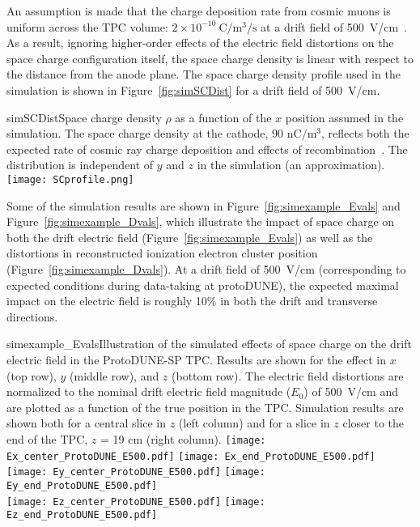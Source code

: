 An assumption is made that the charge deposition rate from cosmic muons is uniform across the TPC volume:  $2{\times}10^{-10}~\mathrm{C}/\mathrm{m}^{3}/\mathrm{s}$ at a drift field of 500~V/cm~\cite{KirkSCE}.  As a result, ignoring higher-order effects of the electric field distortions on the space charge configuration itself, the space charge density is linear with respect to the distance from the anode plane.  The space charge density profile used in the simulation is shown in Figure~\ref{fig:simSCDist} for a drift field of 500~V/cm.

\begin{cdrfigure}{simSCDist}{Space charge density $\rho$ as a function of the $x$ position assumed in the simulation. The space charge density at the cathode, $90$ $\mathrm{nC}/\mathrm{m}^3$, reflects both the expected rate of cosmic ray charge deposition and effects of recombination~\cite{KirkSCE}. The distribution is independent of $y$ and $z$ in the simulation (an approximation).}
\texttt{[image: SCprofile.png]}
\end{cdrfigure}


Some of the simulation results are shown in Figure~\ref{fig:simexample_Evals} and Figure~\ref{fig:simexample_Dvals}, which illustrate the impact of space charge on both the drift electric field (Figure~\ref{fig:simexample_Evals}) as well as the distortions in reconstructed ionization electron cluster position (Figure~\ref{fig:simexample_Dvals}).  At a drift field of 500~V/cm (corresponding to expected conditions during data-taking at protoDUNE), the expected maximal impact on the electric field is roughly 10\% in both the drift and transverse directions.

\begin{cdrfigure}{simexample_Evals}{Illustration of the simulated effects of space charge on the drift electric field in the ProtoDUNE-SP TPC.  Results are shown for the effect in $x$ (top row), $y$ (middle row), and $z$ (bottom row).  The electric field distortions are normalized to the nominal drift electric field magnitude ($E_{0}$) of 500~V/cm and are plotted as a function of the true position in the TPC.  Simulation results are shown both for a central slice in $z$ (left column) and for a slice in $z$ closer to the end of the TPC, $z$ = 19 cm (right column).}
\texttt{[image: Ex\_center\_ProtoDUNE\_E500.pdf]}
\texttt{[image: Ex\_end\_ProtoDUNE\_E500.pdf]}
\\
\texttt{[image: Ey\_center\_ProtoDUNE\_E500.pdf]}
\texttt{[image: Ey\_end\_ProtoDUNE\_E500.pdf]}
\\
\texttt{[image: Ez\_center\_ProtoDUNE\_E500.pdf]}
\texttt{[image: Ez\_end\_ProtoDUNE\_E500.pdf]}
\end{cdrfigure}

